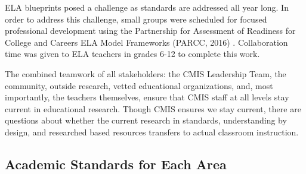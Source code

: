\documentclass{report}
\begin{document}
\begin{findings}

ELA blueprints posed a challenge as standards are addressed all year long. In order to address this challenge, small groups were scheduled for focused professional development using the Partnership for Assessment of Readiness for College and Careers ELA Model Frameworks (PARCC, 2016) . Collaboration time was given to ELA teachers in grades 6-12 to complete this work. 


The combined teamwork of all stakeholders: the CMIS Leadership Team, the community, outside research, vetted educational organizations, and, most importantly,  the teachers themselves, ensure that CMIS staff at all levels stay current in educational research. Though CMIS ensures we stay current, there are questions about whether the current research in standards, understanding by design, and researched based resources transfers to actual classroom instruction. 
\end{findings}

\subsection{Academic Standards for Each Area}


\end{document}
